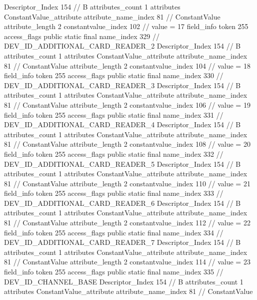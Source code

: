 {{{{{				Descriptor_Index	154		// B
				attributes_count	1
				attributes {
				ConstantValue_attribute {
					attribute_name_index	81		// ConstantValue
					attribute_length	2
					constantvalue_index	102		// value = 17
				}
				}
			}
			field_info {
				token	255
				access_flags	public static final
				name_index	329		// DEV_ID_ADDITIONAL_CARD_READER_2
				Descriptor_Index	154		// B
				attributes_count	1
				attributes {
				ConstantValue_attribute {
					attribute_name_index	81		// ConstantValue
					attribute_length	2
					constantvalue_index	104		// value = 18
				}
				}
			}
			field_info {
				token	255
				access_flags	public static final
				name_index	330		// DEV_ID_ADDITIONAL_CARD_READER_3
				Descriptor_Index	154		// B
				attributes_count	1
				attributes {
				ConstantValue_attribute {
					attribute_name_index	81		// ConstantValue
					attribute_length	2
					constantvalue_index	106		// value = 19
				}
				}
			}
			field_info {
				token	255
				access_flags	public static final
				name_index	331		// DEV_ID_ADDITIONAL_CARD_READER_4
				Descriptor_Index	154		// B
				attributes_count	1
				attributes {
				ConstantValue_attribute {
					attribute_name_index	81		// ConstantValue
					attribute_length	2
					constantvalue_index	108		// value = 20
				}
				}
			}
			field_info {
				token	255
				access_flags	public static final
				name_index	332		// DEV_ID_ADDITIONAL_CARD_READER_5
				Descriptor_Index	154		// B
				attributes_count	1
				attributes {
				ConstantValue_attribute {
					attribute_name_index	81		// ConstantValue
					attribute_length	2
					constantvalue_index	110		// value = 21
				}
				}
			}
			field_info {
				token	255
				access_flags	public static final
				name_index	333		// DEV_ID_ADDITIONAL_CARD_READER_6
				Descriptor_Index	154		// B
				attributes_count	1
				attributes {
				ConstantValue_attribute {
					attribute_name_index	81		// ConstantValue
					attribute_length	2
					constantvalue_index	112		// value = 22
				}
				}
			}
			field_info {
				token	255
				access_flags	public static final
				name_index	334		// DEV_ID_ADDITIONAL_CARD_READER_7
				Descriptor_Index	154		// B
				attributes_count	1
				attributes {
				ConstantValue_attribute {
					attribute_name_index	81		// ConstantValue
					attribute_length	2
					constantvalue_index	114		// value = 23
				}
				}
			}
			field_info {
				token	255
				access_flags	public static final
				name_index	335		// DEV_ID_CHANNEL_BASE
				Descriptor_Index	154		// B
				attributes_count	1
				attributes {
				ConstantValue_attribute {
					attribute_name_index	81		// ConstantValue
}}}}}}}
